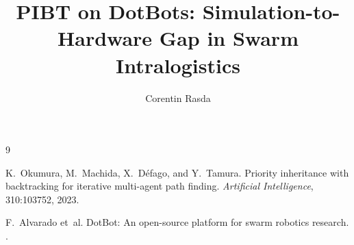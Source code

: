 \documentclass[sigconf, 9pt, nonacm]{acmart}
\title{PIBT on DotBots: Simulation-to-Hardware Gap in Swarm Intralogistics}
\author{Corentin Rasda}
\affiliation{\institution{ESIROI / Inria AIO}\country{France}}
\begin{document}
\maketitle




\begin{thebibliography}{9}

K.~Okumura, M.~Machida, X.~Défago, and Y.~Tamura.
\newblock Priority inheritance with backtracking for iterative multi-agent path finding.
\newblock \emph{Artificial Intelligence}, 310:103752, 2023.

F.~Alvarado et~al.
\newblock DotBot: An open-source platform for swarm robotics research.
.

\end{thebibliography}
\end{document}
